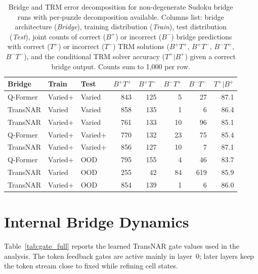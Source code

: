 \documentclass[11pt]{article}
\begin{document}
\begin{table}[t]
\centering
\scriptsize
\setlength{\tabcolsep}{3pt}
\caption{Bridge and TRM error decomposition for non-degenerate Sudoku bridge runs with per-puzzle decomposition available. Columns list: bridge architecture (\textit{Bridge}), training distribution (\textit{Train}), test distribution (\textit{Test}), joint counts of correct ($B^+$) or incorrect ($B^-$) bridge predictions with correct ($T^+$) or incorrect ($T^-$) TRM solutions ($B^+T^+$, $B^+T^-$, $B^-T^+$, $B^-T^-$), and the conditional TRM solver accuracy ($T^+|B^+$) given a correct bridge output. Counts sum to 1,000 per row.}
\label{tab:app_trm_full}
\begin{tabular}{lllrrrrr}
\toprule
Bridge & Train & Test & $B^+T^+$ & $B^+T^-$ & $B^-T^+$ & $B^-T^-$ & $T^+|B^+$ \\
\midrule
Q-Former & Varied+ & Varied  & 843 & 125 & 5  & 27  & 87.1 \\
TransNAR & Varied  & Varied  & 858 & 135 & 1  & 6   & 86.4 \\
TransNAR & Varied+ & Varied  & 761 & 133 & 10 & 96  & 85.1 \\
Q-Former & Varied+ & Varied+ & 770 & 132 & 23 & 75  & 85.4 \\
TransNAR & Varied+ & Varied+ & 856 & 127 & 10 & 7   & 87.1 \\
Q-Former & Varied+ & OOD     & 795 & 155 & 4  & 46  & 83.7 \\
TransNAR & Varied  & OOD     & 255 & 42  & 84 & 619 & 85.9 \\
TransNAR & Varied+ & OOD     & 854 & 139 & 1  & 6   & 86.0 \\
\bottomrule
\end{tabular}
\end{table}

\section{Internal Bridge Dynamics}
\label{app:gate_dynamics}

Table~\ref{tab:gate_full} reports the learned TransNAR gate values used in the analysis.
The token feedback gates are active mainly in layer~0; later layers keep the token stream close to fixed while refining cell states.
\end{document}
